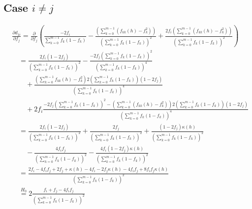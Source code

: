 ﻿\documentclass[12pt,a4paper]{scrreprt}
\theoremstyle{definition}
\begin{document}
\begin{appendices}
{\subsection*{Case $i \neq j$}

\begin{align*}
    & \frac{\partial d_{1i}}{\partial f_j} 
    =  \frac{\partial }{\partial f_j} \left(\frac{-2f_i }{\sum_{k=0}^{m-1}f_k(1-f_k)} - \frac{\left(\sum_{k=0}^{m-1}(f_{kk}(h)-f_k^2)\right)}{\left(\sum_{k=0}^{m-1}f_k(1-f_k)\right)^2} + \frac{2f_i\left(\sum_{k=0}^{m-1}(f_{kk}(h)-f_k^2)\right)}{\left(\sum_{k=0}^{m-1}f_k(1-f_k)\right)^2}\right)\\
    &\quad = \frac{2f_i(1-2f_j)}{(\sum_{k=0}^{m-1}f_k(1-f_k))^2}-  \frac{-2f_j \left(\sum_{k=0}^{m-1}f_k(1-f_k)\right)^2 }{(\sum_{k=0}^{m-1}f_k(1-f_k))^4} \\
    &\qquad + \frac{\left(\sum_{k=0}^{m-1}f_{kk}(h)-f_k^2\right)2(\sum_{k=0}^{m-1}f_k(1-f_k))(1-2f_j)}{(\sum_{k=0}^{m-1}f_k(1-f_k))^4} \\
    &\qquad + 2f_i \frac{-2f_j(\sum_{k=0}^{m-1}f_k(1-f_k))^2- \left(\sum_{k=0}^{m-1}(f_{kk}(h)-f_k^2)\right) 2(\sum_{k=0}^{m-1}f_k(1-f_k))(1-2f_j)}{(\sum_{k=0}^{m-1}f_k(1-f_k))^4}\\ 
    &\quad = \frac{2f_i(1-2f_j)}{(\sum_{k=0}^{m-1}f_k(1-f_k))^2} + \frac{2f_j}{(\sum_{k=0}^{m-1}f_k(1-f_k))^2} + \frac{(1-2f_j)\kappa(h)}{(\sum_{k=0}^{m-1}f_k(1-f_k))^2} \\
    &\qquad - \frac{4 f_i f_j}{(\sum_{k=0}^{m-1}f_k(1-f_k))^2} - \frac{4f_i(1-2 f_j)\kappa(h)}{(\sum_{k=0}^{m-1}f_k(1-f_k))^2} \\
    &\quad = \frac{2f_i -4f_i f_j + 2f_j + \kappa(h) - 4 f_i- 2f_j \kappa(h) - 4f_if_j + 8f_i f_j \kappa(h)    }{(\sum_{k=0}^{m-1}f_k(1-f_k))^2}\\
    &\quad \overset{H_0}{=} 2\frac{f_i+f_j -4f_if_j}{(\sum_{k=0}^{m-1}f_k(1-f_k))^2}
\end{align*}}



\end{appendices}
\end{document}
